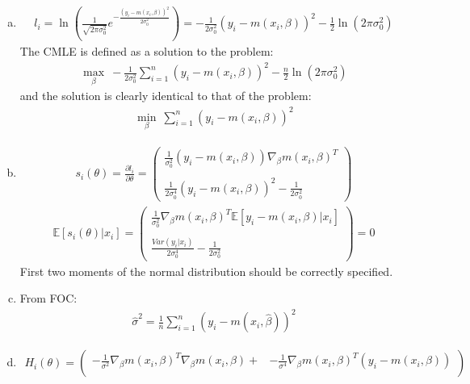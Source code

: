 \documentclass[a4paper]{article}
\newcommand{\expect}{\mathbb{E}}
\newcommand{\summa}{\sum_{i=1}^n}
\begin{document}
\begin{enumerate}[a.]
	\item \begin{align*}
	l_i = \ln \left( \frac{1}{\sqrt{2 \pi \sigma_0^2}} e^{-\frac{(y_i - m(x_i, \beta))^2}{2 \sigma_0^2}} \right) = -\frac{1}{2 \sigma_0^2} (y_i - m(x_i, \beta))^2 - \frac{1}{2} \ln (2 \pi \sigma_0^2)
	\end{align*}
	The CMLE is defined as a solution to the problem:
	\begin{align*}
	\underset{\beta}{\max}\ -\frac{1}{2 \sigma^2_0} \summa (y_i - m(x_i, \beta))^2 - \frac{n}{2} \ln (2 \pi \sigma^2_0)
	\end{align*}
	and the solution is clearly identical to that of the problem:
	\begin{align*}
	\underset{\beta}{\min}\ \summa (y_i - m(x_i, \beta))^2
	\end{align*}
	\item 
	\begin{align*}
	s_i(\theta) = \frac{\partial l_i}{\partial \theta} = \begin{pmatrix}
	\frac{1}{\sigma^2_0}(y_i - m(x_i, \beta))\nabla_{\beta} m(x_i, \beta)^T\\\\
	\frac{1}{2 \sigma_0^4}(y_i - m(x_i, \beta))^2 - \frac{1}{2\sigma^2_0}
	\end{pmatrix}
	\end{align*}
	\begin{align*}
	\expect[s_i(\theta)|x_i] = \begin{pmatrix}
	\frac{1}{\sigma^2_0}\nabla_{\beta} m(x_i, \beta)^T \expect[y_i - m(x_i, \beta)|x_i]\\\\
	\frac{Var(y_i|x_i)}{2 \sigma^4_0} - \frac{1}{2\sigma^2_0}
	\end{pmatrix} = 0
	\end{align*}
	First two moments of the normal distribution should be correctly specified.
	\item From FOC: 
	\begin{align*}
	\hat{\sigma}^2 = \frac{1}{n}\summa (y_i - m(x_i, \hat{\beta}))^2
	\end{align*}
	\item \begin{align*}
	H_i(\theta) = \begin{pmatrix}
	-\frac{1}{\sigma^2} \nabla_{\beta} m(x_i, \beta)^T\nabla_{\beta} m(x_i, \beta) + & -\frac{1}{\sigma^4}\nabla_{\beta} m(x_i, \beta)^T (y_i - m(x_i, \beta))\\

\end{pmatrix}
\end{align*}
\end{enumerate}
\end{document}
